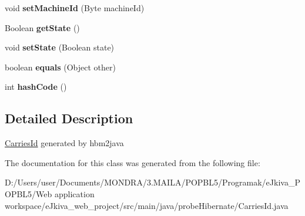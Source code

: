 \begin{DoxyCompactItemize}
void {\bfseries set\+Machine\+Id} (Byte machine\+Id)
\item 
\mbox{\label{classprobe_hibernate_1_1_carries_id_a612f544a8616df5b729c55d7eb0e50db}} 
Boolean {\bfseries get\+State} ()
\item 
\mbox{\label{classprobe_hibernate_1_1_carries_id_a3635eeca4edebf0ca677dd95b6afdb07}} 
void {\bfseries set\+State} (Boolean state)
\item 
\mbox{\label{classprobe_hibernate_1_1_carries_id_a5b8b00910305706625582d572f39f116}} 
boolean {\bfseries equals} (Object other)
\item 
\mbox{\label{classprobe_hibernate_1_1_carries_id_a9e06da2b678dd48eea22738be178ae67}} 
int {\bfseries hash\+Code} ()
\end{DoxyCompactItemize}


\subsection{Detailed Description}
\mbox{\hyperlink{classprobe_hibernate_1_1_carries_id}{Carries\+Id}} generated by hbm2java 

The documentation for this class was generated from the following file\+:\begin{DoxyCompactItemize}
\item 
D\+:/\+Users/user/\+Documents/\+M\+O\+N\+D\+R\+A/3.\+M\+A\+I\+L\+A/\+P\+O\+P\+B\+L5/\+Programak/e\+Jkiva\+\_\+\+P\+O\+P\+B\+L5/\+Web application workspace/e\+Jkiva\+\_\+web\+\_\+project/src/main/java/probe\+Hibernate/Carries\+Id.\+java\end{DoxyCompactItemize}
